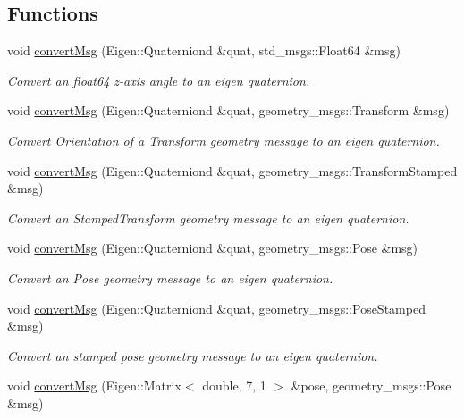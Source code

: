 \subsection*{Functions}
\begin{DoxyCompactItemize}
\item 
void \hyperlink{group__MultiRobotController_ga465b07e16106af072ed5315010fa876c}{convert\+Msg} (Eigen\+::\+Quaterniond \&quat, std\+\_\+msgs\+::\+Float64 \&msg)
\begin{DoxyCompactList}\small\item\em Convert an float64 z-\/axis angle to an eigen quaternion. \end{DoxyCompactList}\item 
void \hyperlink{group__MultiRobotController_gad42169e0be94216cd31a8a360a848155}{convert\+Msg} (Eigen\+::\+Quaterniond \&quat, geometry\+\_\+msgs\+::\+Transform \&msg)
\begin{DoxyCompactList}\small\item\em Convert Orientation of a Transform geometry message to an eigen quaternion. \end{DoxyCompactList}\item 
void \hyperlink{group__MultiRobotController_ga34987bf2293cc8aa5fac7ac60e6510ef}{convert\+Msg} (Eigen\+::\+Quaterniond \&quat, geometry\+\_\+msgs\+::\+Transform\+Stamped \&msg)
\begin{DoxyCompactList}\small\item\em Convert an Stamped\+Transform geometry message to an eigen quaternion. \end{DoxyCompactList}\item 
void \hyperlink{group__MultiRobotController_gadc07db93efb76fd809b67b74dd13b939}{convert\+Msg} (Eigen\+::\+Quaterniond \&quat, geometry\+\_\+msgs\+::\+Pose \&msg)
\begin{DoxyCompactList}\small\item\em Convert an Pose geometry message to an eigen quaternion. \end{DoxyCompactList}\item 
void \hyperlink{group__MultiRobotController_ga8257db2bb94ec53eadfe87d04b38cc0b}{convert\+Msg} (Eigen\+::\+Quaterniond \&quat, geometry\+\_\+msgs\+::\+Pose\+Stamped \&msg)
\begin{DoxyCompactList}\small\item\em Convert an stamped pose geometry message to an eigen quaternion. \end{DoxyCompactList}\item 
void \hyperlink{group__MultiRobotController_gafde5764b46f0189c2aea14ed57434708}{convert\+Msg} (Eigen\+::\+Matrix$<$ double, 7, 1 $>$ \&pose, geometry\+\_\+msgs\+::\+Pose \&msg)

\end{DoxyCompactItemize}
